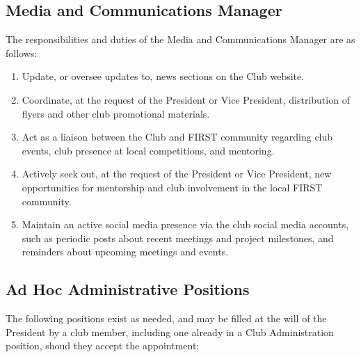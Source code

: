 \documentclass[english,11pt]{article}
\begin{document}
\subsection{Media and Communications Manager}
The responsibilities and duties of the Media and Communications Manager are as follows:

\begin{enumerate}[label=\Alph*.]
\item Update, or oversee updates to, news sections on the Club website.
\item Coordinate, at the request of the President or Vice President, distribution of flyers and other club promotional materials.
\item Act as a liaison between the Club and FIRST community regarding club events, club presence at local competitions, and mentoring.
\item Actively seek out, at the request of the President or Vice President, new opportunities for mentorship and club involvement in the local FIRST community.
\item Maintain an active social media presence via the club social media accounts, such as periodic posts about recent meetings and project milestones, and reminders about upcoming meetings and events.
\end{enumerate}

\subsection{Ad Hoc Administrative Positions}
The following positions exist as needed, and may be filled at the will of the President by a club member, including one already in a Club Administration position, shoud they accept the appointment:
\end{document}
